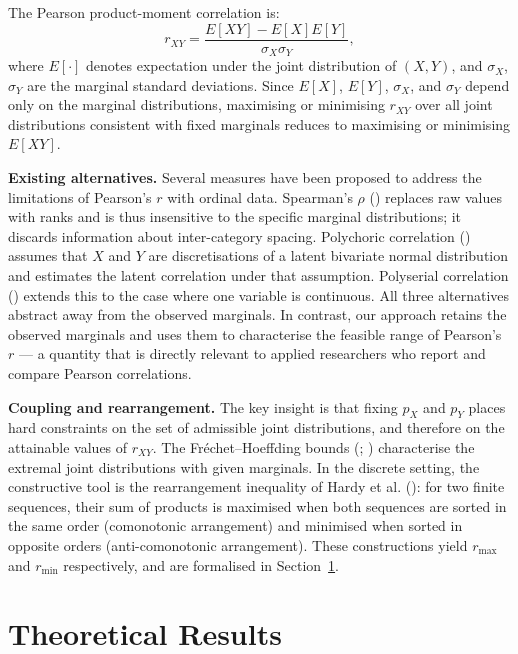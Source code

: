 \documentclass[
  12pt,
]{article}
\theoremstyle{plain}
\theoremstyle{definition}
\theoremstyle{remark}
\begin{document}
The Pearson product-moment correlation is: \[
r_{XY} = \frac{E[XY] - E[X]E[Y]}{\sigma_X \sigma_Y},
\] where \(E[\cdot]\) denotes expectation under the joint distribution
of \((X,Y)\), and \(\sigma_X\), \(\sigma_Y\) are the marginal standard
deviations. Since \(E[X]\), \(E[Y]\), \(\sigma_X\), and \(\sigma_Y\)
depend only on the marginal distributions, maximising or minimising
\(r_{XY}\) over all joint distributions consistent with fixed marginals
reduces to maximising or minimising \(E[XY]\).

\textbf{Existing alternatives.} Several measures have been proposed to
address the limitations of Pearson's \(r\) with ordinal data. Spearman's
\(\rho\) () replaces raw
values with ranks and is thus insensitive to the specific marginal
distributions; it discards information about inter-category spacing.
Polychoric correlation ()
assumes that \(X\) and \(Y\) are discretisations of a latent bivariate
normal distribution and estimates the latent correlation under that
assumption. Polyserial correlation
() extends this to the case
where one variable is continuous. All three alternatives abstract away
from the observed marginals. In contrast, our approach retains the
observed marginals and uses them to characterise the feasible range of
Pearson's \(r\) --- a quantity that is directly relevant to applied
researchers who report and compare Pearson correlations.

\textbf{Coupling and rearrangement.} The key insight is that fixing
\(p_X\) and \(p_Y\) places hard constraints on the set of admissible
joint distributions, and therefore on the attainable values of
\(r_{XY}\). The Fréchet--Hoeffding bounds
(;
) characterise
the extremal joint distributions with given marginals. In the discrete
setting, the constructive tool is the rearrangement inequality of Hardy
et al. (): for two finite
sequences, their sum of products is maximised when both sequences are
sorted in the same order (comonotonic arrangement) and minimised when
sorted in opposite orders (anti-comonotonic arrangement). These
constructions yield \(r_{\max}\) and \(r_{\min}\) respectively, and are
formalised in Section~\ref{sec-theory}.

\section{Theoretical Results}\label{sec-theory}
\end{document}
